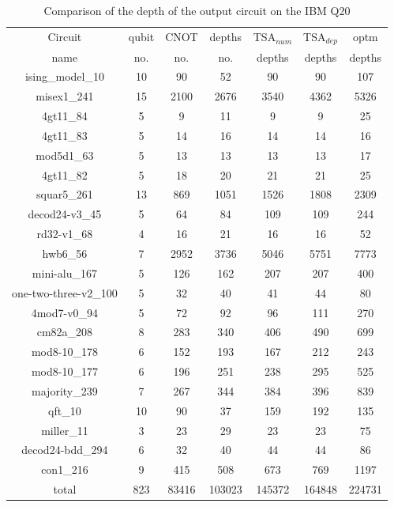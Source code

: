 \documentclass[runningheads]{llncs}
\begin{document}
							\begin{table}[H]
								\label{tab8}
								\begin{center}  
								\begin{tabular}{|c|c|c|c|c|c|c|}
								\hline
								Circuit &  qubit  & CNOT &depths &TSA$_{num}$& TSA$_{dep}$  & optm 	  	\\
								 name	&   no. 	&	no. & no. & depths&  depths &  depths 	\\
								\hline
								ising\_model\_10 & 10 & 90 & 52 & 90 & 90 & 107 \\
								misex1\_241 & 15 & 2100 & 2676 & 3540 & 4362 & 5326 \\
								4gt11\_84 & 5 & 9 & 11 & 9 & 9 & 25 \\
								4gt11\_83 & 5 & 14 & 16 & 14 & 14 & 16 \\
								mod5d1\_63 & 5 & 13 & 13 & 13 & 13 & 17 \\
								4gt11\_82 & 5 & 18 & 20 & 21 & 21 & 25 \\
								squar5\_261 & 13 & 869 & 1051 & 1526 & 1808 & 2309 \\
								decod24-v3\_45 & 5 & 64 & 84 & 109 & 109 & 244 \\
								rd32-v1\_68 & 4 & 16 & 21 & 16 & 16 & 52 \\
								hwb6\_56 & 7 & 2952 & 3736 & 5046 & 5751 & 7773 \\
								mini-alu\_167 & 5 & 126 & 162 & 207 & 207 & 400 \\
								one-two-three-v2\_100 & 5 & 32 & 40 & 41 & 44 & 80 \\
								4mod7-v0\_94 & 5 & 72 & 92 & 96 & 111 & 270 \\
								cm82a\_208 & 8 & 283 & 340 & 406 & 490 & 699 \\
								mod8-10\_178 & 6 & 152 & 193 & 167 & 212 & 243 \\
								mod8-10\_177 & 6 & 196 & 251 & 238 & 295 & 525 \\
								majority\_239 & 7 & 267 & 344 & 384 & 396 & 839 \\
								qft\_10 & 10 & 90 & 37 & 159 & 192 & 135 \\
								miller\_11 & 3 & 23 & 29 & 23 & 23 & 75 \\
								decod24-bdd\_294 & 6 & 32 & 40 & 44 & 44 & 86 \\
								con1\_216 & 9 & 415 & 508 & 673 & 769 & 1197 \\
								\hline
								total & 823 & 83416 & 103023 & 145372 & 164848 & 224731  \\
							\hline
								\end{tabular} 
								\end{center}						
								\caption{Comparison of  the depth of the output circuit on the IBM Q20} 
								\label{tab8}\end{table}
\end{document}

